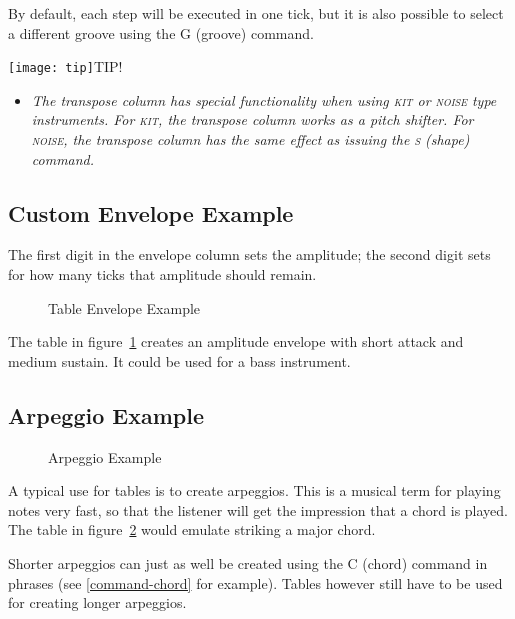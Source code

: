 By default, each step will be executed in one tick, but it is also possible to select a different groove using the G (groove) command.

\texttt{[image: tip]}TIP!
\begin{itemize}
	\item \textit{The transpose column has special functionality when using \textsc{kit} or \textsc{noise} type instruments. For \textsc{kit}, the transpose column works as a pitch shifter. For \textsc{noise}, the transpose column has the same effect as issuing the \textsc{s} (shape) command.}
\end{itemize}

\subsection{Custom Envelope Example}

The first digit in the envelope column sets the amplitude; the second digit sets for how many ticks that amplitude should remain.

\begin{figure}[htpb]
	\begin{center}
	\end{center}
	\caption{Table Envelope Example}
	\label{fig:table-amp}
\end{figure}

The table in figure~\ref{fig:table-amp} creates an amplitude envelope with short attack and medium sustain. It could be used for a bass instrument.

\subsection{Arpeggio Example}

\begin{figure}[htpb]
	\begin{center}
	\end{center}
	\caption{Arpeggio Example}
	\label{fig:table-arp}
\end{figure}

A typical use for tables is to create arpeggios. This is a musical term for playing notes very fast, so that the listener will get the impression that a chord is played. The table in figure~\ref{fig:table-arp} would emulate striking a major chord.

Shorter arpeggios can just as well be created using the C (chord) command in phrases (see \ref{command-chord} for example). Tables however still have to be used for creating longer arpeggios.


